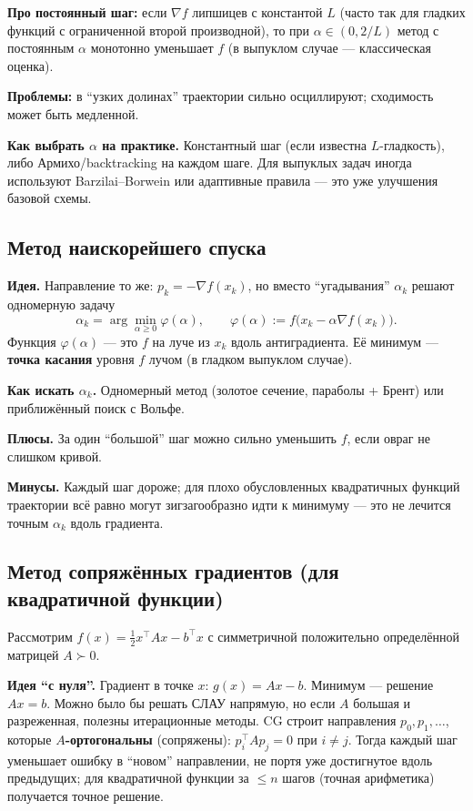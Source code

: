 \documentclass[12pt,a4paper]{article}
\newcommand{\grad}{\nabla}
\begin{document}
\textbf{Про постоянный шаг:} если \(\grad f\) липшицев с константой \(L\) (часто так для гладких функций с ограниченной второй производной), то при \(\alpha\in(0,2/L)\) метод с постоянным \(\alpha\) монотонно уменьшает \(f\) (в выпуклом случае --- классическая оценка).

\textbf{Проблемы:} в ``узких долинах'' траектории сильно осциллируют; сходимость может быть медленной.

\textbf{Как выбрать \(\alpha\) на практике.} Константный шаг (если известна \(L\)-гладкость), либо Армихо/backtracking на каждом шаге. Для выпуклых задач иногда используют Barzilai--Borwein или адаптивные правила --- это уже улучшения базовой схемы.

\subsection{Метод наискорейшего спуска}
\textbf{Идея.} Направление то же: \(p_k=-\grad f(x_k)\), но вместо ``угадывания'' \(\alpha_k\) решают одномерную задачу
\[
  \alpha_k=\arg\min_{\alpha\ge 0} \varphi(\alpha),\qquad \varphi(\alpha):=f\bigl(x_k-\alpha\grad f(x_k)\bigr).
\]
Функция \(\varphi(\alpha)\) --- это \(f\) на луче из \(x_k\) вдоль антиградиента. Её минимум --- \textbf{точка касания} уровня \(f\) лучом (в гладком выпуклом случае).

\textbf{Как искать \(\alpha_k\).} Одномерный метод (золотое сечение, параболы + Брент) или приближённый поиск с Вольфе.

\textbf{Плюсы.} За один ``большой'' шаг можно сильно уменьшить \(f\), если овраг не слишком кривой.

\textbf{Минусы.} Каждый шаг дороже; для плохо обусловленных квадратичных функций траектории всё равно могут зигзагообразно идти к минимуму --- это не лечится точным \(\alpha_k\) вдоль градиента.

\subsection{Метод сопряжённых градиентов (для квадратичной функции)}
Рассмотрим \(f(x)=\tfrac12 x^\top Ax-b^\top x\) с симметричной положительно определённой матрицей \(A\succ 0\).

\textbf{Идея ``с нуля''.} Градиент в точке \(x\): \(g(x)=Ax-b\). Минимум --- решение \(Ax=b\). Можно было бы решать СЛАУ напрямую, но если \(A\) большая и разреженная, полезны итерационные методы. CG строит направления \(p_0,p_1,\ldots\), которые \textbf{\(A\)-ортогональны} (сопряжены): \(p_i^\top A p_j=0\) при \(i\neq j\). Тогда каждый шаг уменьшает ошибку в ``новом'' направлении, не портя уже достигнутое вдоль предыдущих; для квадратичной функции за \(\le n\) шагов (точная арифметика) получается точное решение.
\end{document}
